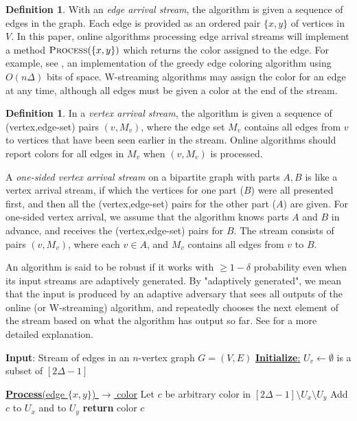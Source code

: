\documentclass[10pt]{article}
\theoremstyle{definition}\newtheorem{definition}[lemma]{Definition}
\theoremstyle{remark}  \newtheorem*{remark}{Remark}
\begin{document}
\begin{definition}
    With an \emph{edge arrival stream}, the algorithm is given a sequence of edges in the graph. Each edge is provided as an ordered pair $\{x,y\}$ of vertices in $V$. In this paper, online algorithms processing edge arrival streams will implement a method $\textsc{Process}(\{x,y\})$ which returns the color assigned to the edge. For example, see  , an implementation of the greedy edge coloring algorithm using $O(n \Delta)$ bits of space. W-streaming algorithms may assign the color for an edge at any time, although all edges must be given a color at the end of the stream.
\end{definition}

\begin{definition}
    In a \emph{vertex arrival stream}, the algorithm is given a sequence of (vertex,edge-set) pairs $(v,M_v)$, where the edge set $M_v$ contains all
    edges from $v$ to vertices that have been seen earlier in the stream. Online algorithms should report colors for all edges in $M_v$ when  $(v,M_v)$ is processed.

    A \emph{one-sided vertex arrival stream} on a bipartite graph with parts $A,B$ is like a vertex arrival stream, if which the vertices for one part ($B$) were all presented first, and then all the (vertex,edge-set) pairs for the other part ($A$) are given. For one-sided vertex arrival, we assume that the algorithm knows parts $A$ and $B$ in advance, and receives the
    (vertex,edge-set) pairs for $B$. The stream consists of pairs $(v,M_v)$, where each $v \in A$, and $M_v$ contains all edges from $v$ to $B$.
\end{definition}

An algorithm is said to be robust if it works with $\ge 1- \delta$ probability
even when its input streams are adaptively generated. By "adaptively generated",
we mean that the input is produced by an adaptive adversary that sees all outputs
of the online (or W-streaming) algorithm, and repeatedly 
chooses the next element of the stream based on what the algorithm has output so
far. See \cite{BenEliezerJWY20} for a more detailed explanation.

\begin{algorithm}[htb!]
  \caption{An implementation of a greedy $2\Delta-1$ online edge-coloring algorithm using $O(n \Delta)$ bits of space \label{alg:simple-greedy}}
  \begin{algorithmic}[1]
  \Statex \textbf{Input}: Stream of edges in an $n$-vertex graph $G = (V,E)$
    \Statex
    \Statex \underline{\textbf{Initialize}:}
    \State $U_v \gets \emptyset$ is a subset of $[2\Delta-1]$
    \EndFor
    \Statex
    
  \Statex \underline{\textbf{Process}(edge $\{x,y\}$) $\rightarrow$ color} 
    \State Let $c$ be arbitrary color in $[2\Delta-1] \setminus U_x \setminus U_y$
    \State Add $c$ to $U_x$ and to $U_y$
    \State \textbf{return} color $c$
  \end{algorithmic}
\end{algorithm}
\end{document}

